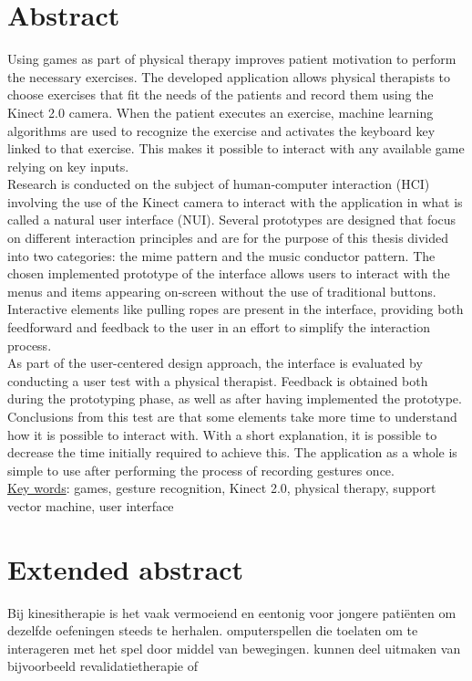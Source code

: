 \chapter*{Abstract}

Using games as part of physical therapy improves patient motivation to perform the necessary exercises. The developed application allows physical therapists to choose exercises that fit the needs of the patients and record them using the Kinect 2.0 camera. When the patient executes an exercise, machine learning algorithms are used to recognize the exercise and activates the keyboard key linked to that exercise. This makes it possible to interact with any available game relying on key inputs.\\

Research is conducted on the subject of human-computer interaction (HCI) involving the use of the Kinect camera to interact with the application in what is called a natural user interface (NUI). Several prototypes are designed that focus on different interaction principles and are for the purpose of this thesis divided into two categories: the mime pattern and the music conductor pattern. The chosen implemented prototype of the interface allows users to interact with the menus and items appearing on-screen without the use of traditional buttons. Interactive elements like pulling ropes are present in the interface, providing both feedforward and feedback to the user in an effort to simplify the interaction process.\\

As part of the user-centered design approach, the interface is evaluated by conducting a user test with a physical therapist. Feedback is obtained both during the prototyping phase, as well as after having implemented the prototype. Conclusions from this test are that some elements take more time to understand how it is possible to interact with. With a short explanation, it is possible to decrease the time initially required to achieve this. The application as a whole is simple to use after performing the process of recording gestures once.\\

\underline{Key words}: games, gesture recognition, Kinect 2.0, physical therapy, support vector machine, user interface


\chapter*{Extended abstract}

Bij kinesitherapie is het vaak vermoeiend en eentonig voor jongere pati\"enten om dezelfde oefeningen steeds te herhalen. omputerspellen die toelaten om te interageren met het spel door middel van bewegingen. kunnen deel uitmaken van bijvoorbeeld revalidatietherapie of 